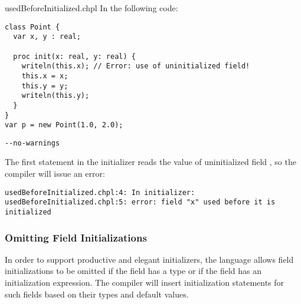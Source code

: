 \begin{chapelexample}{usedBeforeInitialized.chpl}
In the following code:
\begin{chapel}
\begin{verbatim}
class Point {
  var x, y : real;

  proc init(x: real, y: real) {
    writeln(this.x); // Error: use of uninitialized field!
    this.x = x;
    this.y = y;
    writeln(this.y);
  }
}
var p = new Point(1.0, 2.0);
\end{verbatim}
\end{chapel}
\begin{chapelcompopts}
\begin{verbatim}
--no-warnings
\end{verbatim}
\end{chapelcompopts}

The first statement in the initializer reads the value of uninitialized field
, so the compiler will issue an error:

\begin{chapelprintoutput}
\begin{verbatim}
usedBeforeInitialized.chpl:4: In initializer:
usedBeforeInitialized.chpl:5: error: field "x" used before it is initialized
\end{verbatim}
\end{chapelprintoutput}

\end{chapelexample}

\subsubsection{Omitting Field Initializations}
\label{Omitting_Field_Initializations}

In order to support productive and elegant initializers, the language allows
field initializations to be omitted if the field has a type or if the field has
an initialization expression. The compiler will insert initialization
statements for such fields based on their types and default values.

